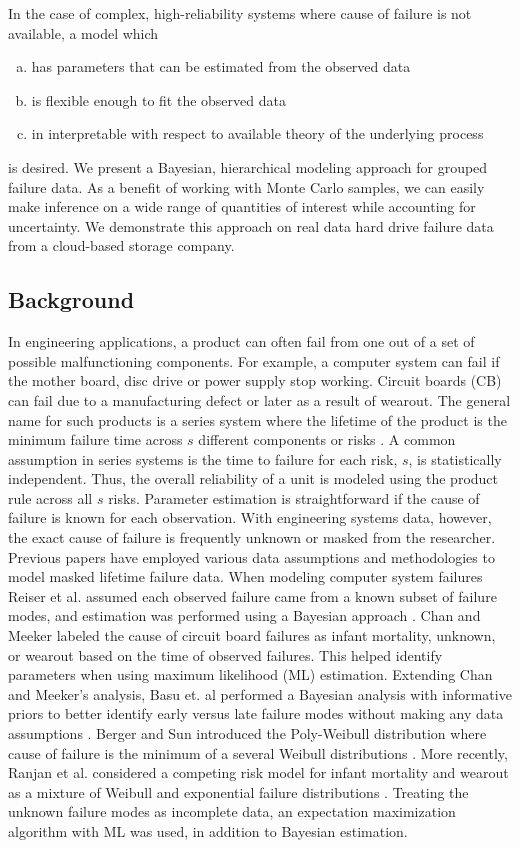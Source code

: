 \documentclass[12pt]{article}
\begin{document}
In the case of complex, high-reliability systems where cause of failure is
not available, a model which
\begin{enumerate}[a.]
\item has parameters that can be estimated from the observed data
\item is flexible enough to fit the observed data
\item in interpretable with respect to available theory of the underlying process
\end{enumerate}
is desired. We present a Bayesian, hierarchical modeling approach for
grouped failure data. As a benefit of working with Monte Carlo
samples, we can easily make inference on a wide range of quantities of
interest while accounting for uncertainty. We demonstrate this approach on real data hard
drive failure data from a
cloud-based storage company.

\subsection{Background}
In engineering applications, a product can often fail from one out of a set of possible malfunctioning components.  For example, a computer system can fail if the mother board, disc drive or power supply stop working.  Circuit boards (CB) can fail due to a manufacturing defect or later as a result of wearout.  The general name for such products is a series system where the lifetime of the product is the minimum failure time across $s$ different components or risks \cite{nelson}.  A common assumption in series systems is the time to failure for each risk, $s$, is statistically independent.  Thus, the overall reliability of a unit is modeled using the product rule across all $s$ risks.  Parameter estimation is straightforward if the cause of failure is known for each observation.  With engineering systems data, however, the exact cause of failure is frequently unknown or masked from the researcher.  \\

Previous papers have employed various data assumptions and methodologies to model masked lifetime failure data.  When modeling computer system failures Reiser et al. assumed each observed failure came from a known subset of failure modes, and estimation was performed using a Bayesian approach \cite{reiser}.  Chan and Meeker labeled the cause of circuit board failures as infant mortality, unknown, or wearout based on the time of observed failures.  This helped identify parameters when using maximum likelihood (ML) estimation.  Extending Chan and Meeker's analysis, Basu et. al performed a Bayesian analysis with informative priors to better identify early versus late failure modes without making any data assumptions \cite{basu}.  Berger and Sun introduced the Poly-Weibull distribution where cause of failure is the minimum of a several Weibull distributions \cite{berger}.  More recently, Ranjan et al. considered a competing risk model for infant mortality and wearout as a mixture of Weibull and exponential failure distributions \cite{ranjan}.  Treating the unknown failure modes as incomplete data, an expectation maximization algorithm with ML was used, in addition to Bayesian estimation.
\end{document}
